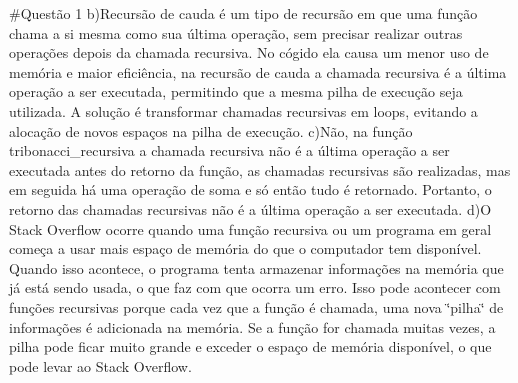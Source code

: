 \#\+Questão 1 b)Recursão de cauda é um tipo de recursão em que uma função chama a si mesma como sua última operação, sem precisar realizar outras operações depois da chamada recursiva. No cógido ela causa um menor uso de memória e maior eficiência, na recursão de cauda a chamada recursiva é a última operação a ser executada, permitindo que a mesma pilha de execução seja utilizada. A solução é transformar chamadas recursivas em loops, evitando a alocação de novos espaços na pilha de execução. c)Não, na função tribonacci\+\_\+recursiva a chamada recursiva não é a última operação a ser executada antes do retorno da função, as chamadas recursivas são realizadas, mas em seguida há uma operação de soma e só então tudo é retornado. Portanto, o retorno das chamadas recursivas não é a última operação a ser executada. d)O Stack Overflow ocorre quando uma função recursiva ou um programa em geral começa a usar mais espaço de memória do que o computador tem disponível. Quando isso acontece, o programa tenta armazenar informações na memória que já está sendo usada, o que faz com que ocorra um erro. Isso pode acontecer com funções recursivas porque cada vez que a função é chamada, uma nova \char`\"{}pilha\char`\"{} de informações é adicionada na memória. Se a função for chamada muitas vezes, a pilha pode ficar muito grande e exceder o espaço de memória disponível, o que pode levar ao Stack Overflow. 